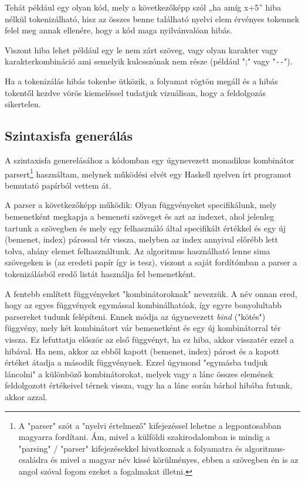 Tehát például egy olyan kód, mely a következőképp szól „ha amíg x+5” hiba nélkül tokenizálható, hisz az összes benne található nyelvi elem érvényes tokennek felel meg annak ellenére, hogy a kód maga nyilvánvalóan hibás.

Viszont hiba lehet például egy le nem zárt szöveg, vagy olyan karakter vagy karakterkombináció ami semelyik kulcsszónak nem része (például ";" vagy "\verb|--|").

Ha a tokenizálás hibás tokenbe ütközik, a folyamat rögtön megáll és a hibás tokentől kezdve vörös kiemeléssel tudatjuk vizuálisan, hogy a feldolgozás sikertelen.

\subsection{Szintaxisfa generálás}
\label{sec:parser}

A szintaxisfa generelásához a kódomban egy úgynevezett monadikus kombinátor parsert\footnote{A "parser" szót a "nyelvi értelmező" kifejezéssel lehetne a legpontosabban magyarra fordítani. Ám, mivel a külföldi szakirodalomban is mindig a "parsing" / "parser" kifejezésekkel hivatkoznak a folyamatra és algoritmus-családra és mivel a magyar név kissé körülményes, ebben a szövegben én is az angol szóval fogom ezeket a fogalmakat illetni.} használtam, melynek működési elvét egy Haskell nyelven írt programot bemutató papírból\cite{monadic} vettem át.

A parser a következőképp működik: Olyan függvényeket specifikálunk, mely bemenetként megkapja a bemeneti szöveget és azt az indexet, ahol jelenleg tartunk a szövegben és mely egy felhasználó által specifikált értékkel és egy új (bemenet, index) párossal tér vissza, melyben az index annyival előrébb lett tolva, ahány elemet felhasználtunk. Az algoritmus használható lenne sima szövegeken is (az eredeti papír így is tesz), viszont a saját fordítómban a parser a tokenizálásból eredő listát használja fel bemenetként.

A fentebb említett függvényeket "kombinátoroknak" nevezzük. A név onnan ered, hogy az egyes függvények egymással kombinálhatóak, így egyre bonyolultabb parsereket tudunk felépíteni. Ennek módja az úgynevezett \textit{bind} ("kötés") függvény, mely két kombinátort vár bemenetként és egy új kombinátorral tér vissza. Ez lefuttatja először az első függvényt, ha ez hiba, akkor visszatér ezzel a hibával. Ha nem, akkor az ebből kapott (bemenet, index) párost és a kapott értéket átadja a második függvénynek. Ezzel úgymond "egymásba tudjuk láncolni" a különböző kombinátorokat, melyek vagy a lánc összes elemének feldolgozott értékeivel térnek vissza, vagy ha a lánc során bárhol hibába futunk, akkor azzal.

